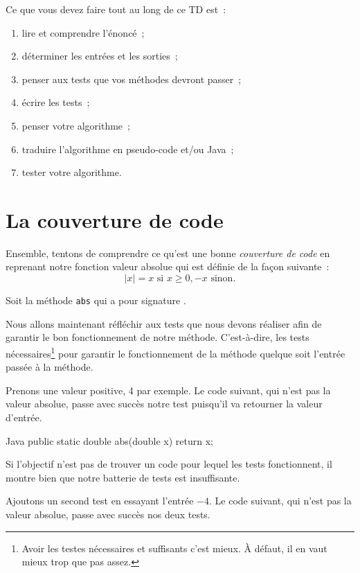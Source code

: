 \documentclass[a4paper,11pt]{article}
\begin{document}
	Ce que vous devez faire tout au long de ce TD est~:
	\begin{enumerate}
		\item lire et comprendre l'énoncé~;
		\item déterminer les entrées et les sorties~;
		\item penser aux tests que vos méthodes devront passer~;
		\item écrire les tests~;
		\item penser votre algorithme~;
		\item traduire l'algorithme en pseudo-code et/ou Java~;
		\item tester votre algorithme.
	\end{enumerate}


\section{La couverture de code}

	Ensemble, tentons de comprendre ce qu'est une bonne \emph{couverture de code} en reprenant notre fonction valeur absolue qui est définie de la façon suivante~:
	$$
		|x| = x \textrm{ si } x \geq 0, -x \textrm{ sinon}.
	$$

	Soit la méthode \texttt{abs} qui a pour signature .

	Nous allons maintenant réfléchir aux tests que nous devons réaliser afin de garantir le bon fonctionnement de notre méthode. C'est-à-dire, les tests nécessaires\footnote{Avoir les testes nécessaires et suffisants c'est mieux. À défaut, il en vaut mieux trop que pas assez.} pour garantir le fonctionnement de la méthode quelque soit l'entrée passée à la méthode.

	Prenons une valeur positive, 4 par exemple. Le code suivant, qui n'est pas la valeur absolue, passe avec succès notre test puisqu'il va retourner la valeur d'entrée.
	\begin{Code}{Java}
		public static double abs(double x) {
			return x;
		}
	\end{Code}


	Si l'objectif n'est pas de trouver un code pour lequel les tests fonctionnent, il montre bien que notre batterie de tests est insuffisante.

	Ajoutons un second test en essayant l'entrée $-4$. Le code suivant, qui n'est pas la valeur absolue, passe avec succès nos deux tests. 
\end{document}
